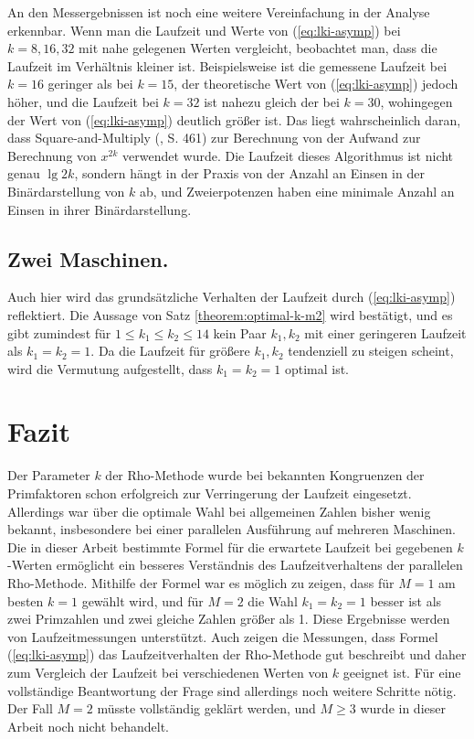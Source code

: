 \documentclass[a4paper, 11pt, ngerman]{article}
\theoremstyle{definition}
\theoremstyle{plain}
\theoremstyle{remark}
\begin{document}
An den Messergebnissen ist noch eine weitere Vereinfachung in der Analyse erkennbar. Wenn man die Laufzeit und Werte von (\ref{eq:lki-asymp}) bei $k = 8, 16, 32$ mit nahe gelegenen Werten vergleicht, beobachtet man, dass die Laufzeit im Verhältnis kleiner ist. Beispielsweise ist die gemessene Laufzeit bei $k = 16$ geringer als bei $k = 15$, der theoretische Wert von (\ref{eq:lki-asymp}) jedoch höher, und die Laufzeit bei $k = 32$ ist nahezu gleich der bei $k = 30$, wohingegen der Wert von (\ref{eq:lki-asymp}) deutlich größer ist. Das liegt wahrscheinlich daran, dass Square-and-Multiply (\cite{knu98}, S. 461) zur Berechnung von der Aufwand zur Berechnung von $x^{2k}$ verwendet wurde. Die Laufzeit dieses Algorithmus ist nicht genau $\lg 2k$, sondern hängt in der Praxis von der Anzahl an Einsen in der Binärdarstellung von $k$ ab, und Zweierpotenzen haben eine minimale Anzahl an Einsen in ihrer Binärdarstellung.

\subsection{Zwei Maschinen.}

Auch hier wird das grundsätzliche Verhalten der Laufzeit durch (\ref{eq:lki-asymp}) reflektiert. Die Aussage von Satz \ref{theorem:optimal-k-m2} wird bestätigt, und es gibt zumindest für $1 \le k_1 \le k_2 \le 14$ kein Paar $k_1, k_2$ mit einer geringeren Laufzeit als $k_1 = k_2 = 1$. Da die Laufzeit für größere $k_1, k_2$ tendenziell zu steigen scheint, wird die Vermutung aufgestellt, dass $k_1 = k_2 = 1$ optimal ist.

\section{Fazit}

Der Parameter $k$ der Rho-Methode wurde bei bekannten Kongruenzen der Primfaktoren schon erfolgreich zur Verringerung der Laufzeit eingesetzt. Allerdings war über die optimale Wahl bei allgemeinen Zahlen bisher wenig bekannt, insbesondere bei einer parallelen Ausführung auf mehreren Maschinen. Die in dieser Arbeit bestimmte Formel für die erwartete Laufzeit bei gegebenen $k$-Werten ermöglicht ein besseres Verständnis des Laufzeitverhaltens der parallelen Rho-Methode. Mithilfe der Formel war es möglich zu zeigen, dass für $M = 1$ am besten $k = 1$ gewählt wird, und für $M = 2$ die Wahl $k_1 = k_2 = 1$ besser ist als zwei Primzahlen und zwei gleiche Zahlen größer als 1. Diese Ergebnisse werden von Laufzeitmessungen unterstützt. Auch zeigen die Messungen, dass Formel (\ref{eq:lki-asymp}) das Laufzeitverhalten der Rho-Methode gut beschreibt und daher zum Vergleich der Laufzeit bei verschiedenen Werten von $k$ geeignet ist. Für eine vollständige Beantwortung der Frage sind allerdings noch weitere Schritte nötig. Der Fall $M = 2$ müsste vollständig geklärt werden, und $M \ge 3$ wurde in dieser Arbeit noch nicht behandelt.
\end{document}
